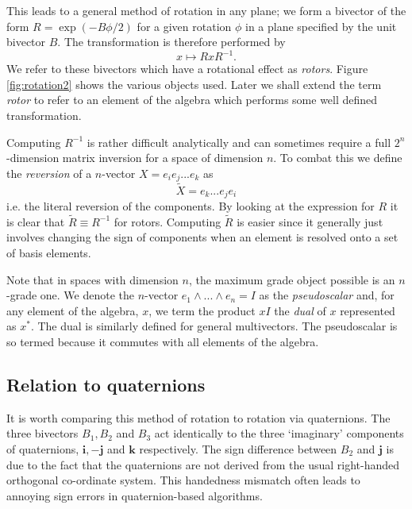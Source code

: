 This leads to a general method of rotation in any plane; we
form a bivector of the form $R = \exp({-B\phi/2})$ for a given rotation 
$\phi$ in a plane specified by the unit bivector $B$. The transformation
is therefore performed by
\begin{displaymath}
x \mapsto RxR^{-1}.
\end{displaymath}
We refer to these bivectors which have a rotational effect as \emph{rotors}.
Figure \ref{fig:rotation2} shows the various objects used. Later we shall
extend the term \emph{rotor} to refer to an element of the algebra which
performs some well defined transformation.

Computing $R^{-1}$ is rather difficult analytically and can sometimes
require a full $2^n$-dimension matrix inversion for a space of
dimension $n$. To combat this we define
the \emph{reversion} of a $n$-vector $X = e_ie_j...e_k$ as
\[
\tilde{X} = e_k...e_je_i
\]
i.e. the literal reversion of the components. By looking at the expression for
$R$ it is clear that $\tilde{R} \equiv R^{-1}$ for rotors. Computing
$\tilde{R}$ is easier since it generally just involves changing the sign of
components when an element is resolved onto a set of basis elements.

Note that in spaces with dimension $n$, the maximum grade object possible is
an $n$-grade one. We denote the $n$-vector $e_1 \wedge ... \wedge e_n = I$ as
the \emph{pseudoscalar} and, for any element of the algebra, $x$,
we term the product $xI$ the \emph{dual} of $x$ represented as
$x^*$. The dual is similarly defined for general multivectors. The
pseudoscalar is so termed because it commutes with all elements of the
algebra.

\subsection{Relation to quaternions}
\label{sec:quaternions}

It is worth comparing this method of rotation to rotation via
quaternions. The three bivectors $B_1,B_2$ and $B_3$ act identically to the
three `imaginary' components of quaternions, $\mathbf{i}, -\mathbf{j}$ and
$\mathbf{k}$ respectively. The sign difference between $B_2$ and $\mathbf{j}$
is due to the fact that the quaternions are not derived from the usual
right-handed orthogonal co-ordinate system. This handedness mismatch often
leads to annoying sign errors in quaternion-based algorithms.

